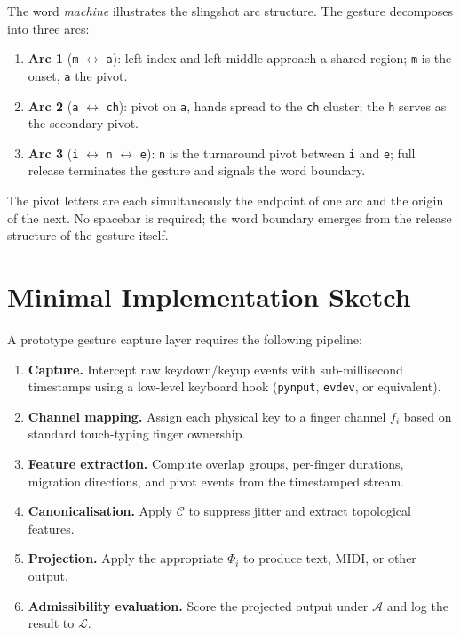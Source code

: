 \documentclass[11pt, a4paper]{article}
\begin{document}
The word \emph{machine} illustrates the slingshot arc structure. The
gesture decomposes into three arcs:

\begin{enumerate}
  \item \textbf{Arc 1} (\texttt{m} $\leftrightarrow$ \texttt{a}): left
    index and left middle approach a shared region; \texttt{m} is the
    onset, \texttt{a} the pivot.
  \item \textbf{Arc 2} (\texttt{a} $\leftrightarrow$ \texttt{ch}):
    pivot on \texttt{a}, hands spread to the \texttt{ch} cluster; the
    \texttt{h} serves as the secondary pivot.
  \item \textbf{Arc 3} (\texttt{i} $\leftrightarrow$ \texttt{n}
    $\leftrightarrow$ \texttt{e}): \texttt{n} is the turnaround pivot
    between \texttt{i} and \texttt{e}; full release terminates the
    gesture and signals the word boundary.
\end{enumerate}

The pivot letters are each simultaneously the endpoint of one arc and
the origin of the next. No spacebar is required; the word boundary
emerges from the release structure of the gesture itself.

\section{Minimal Implementation Sketch}

A prototype gesture capture layer requires the following pipeline:

\begin{enumerate}
  \item \textbf{Capture.} Intercept raw keydown/keyup events with
    sub-millisecond timestamps using a low-level keyboard hook
    (\texttt{pynput}, \texttt{evdev}, or equivalent).
  \item \textbf{Channel mapping.} Assign each physical key to a finger
    channel $f_i$ based on standard touch-typing finger ownership.
  \item \textbf{Feature extraction.} Compute overlap groups, per-finger
    durations, migration directions, and pivot events from the timestamped
    stream.
  \item \textbf{Canonicalisation.} Apply $\mathcal{C}$ to suppress jitter
    and extract topological features.
  \item \textbf{Projection.} Apply the appropriate $\Phi_i$ to produce
    text, MIDI, or other output.
  \item \textbf{Admissibility evaluation.} Score the projected output
    under $\mathcal{A}$ and log the result to $\mathcal{L}$.
\end{enumerate}
\end{document}
